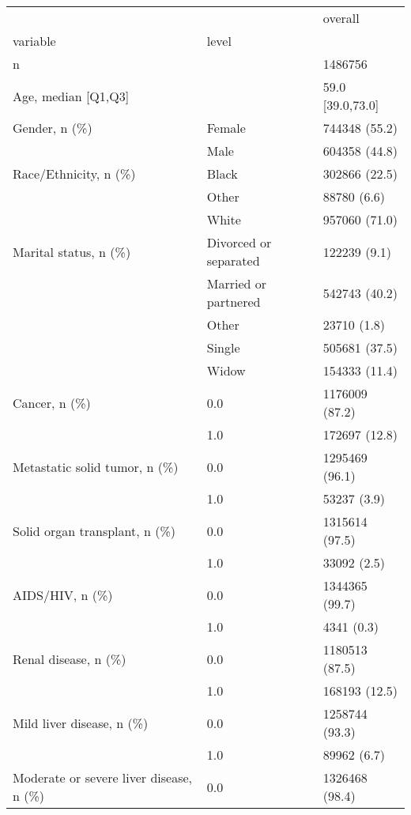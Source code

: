 \begin{tabular}{lll}
\toprule
                           &   &            overall \\
variable & level &                    \\
\midrule
n &   &            1486756 \\
Age, median [Q1,Q3] &   &   59.0 [39.0,73.0] \\
Gender, n (\%) & Female &      744348 (55.2) \\
                           & Male &      604358 (44.8) \\
Race/Ethnicity, n (\%) & Black &      302866 (22.5) \\
                           & Other &        88780 (6.6) \\
                           & White &      957060 (71.0) \\
Marital status, n (\%) & Divorced or separated &       122239 (9.1) \\
                           & Married or partnered &      542743 (40.2) \\
                           & Other &        23710 (1.8) \\
                           & Single &      505681 (37.5) \\
                           & Widow &      154333 (11.4) \\
Cancer, n (\%) & 0.0 &     1176009 (87.2) \\
                           & 1.0 &      172697 (12.8) \\
Metastatic solid tumor, n (\%) & 0.0 &     1295469 (96.1) \\
                           & 1.0 &        53237 (3.9) \\
Solid organ transplant, n (\%) & 0.0 &     1315614 (97.5) \\
                           & 1.0 &        33092 (2.5) \\
AIDS/HIV, n (\%) & 0.0 &     1344365 (99.7) \\
                           & 1.0 &         4341 (0.3) \\
Renal disease, n (\%) & 0.0 &     1180513 (87.5) \\
                           & 1.0 &      168193 (12.5) \\
Mild liver disease, n (\%) & 0.0 &     1258744 (93.3) \\
                           & 1.0 &        89962 (6.7) \\
Moderate or severe liver disease, n (\%) & 0.0 &     1326468 (98.4) \\

\end{tabular}
